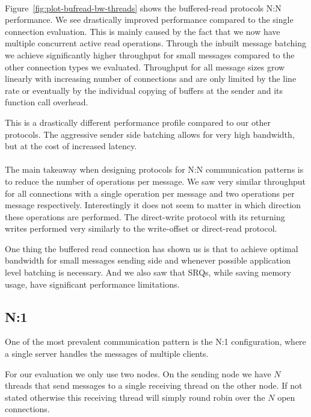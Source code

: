 \paragraph{} Figure~\ref{fig:plot-bufread-bw-threads} shows the buffered-read protocols N:N performance. We see drastically 
improved performance compared to the single connection evaluation. This is mainly caused by the fact that we now have multiple
concurrent active read operations. Through the inbuilt message batching we achieve  significantly higher throughput for small
messages compared to the other connection types we evaluated. Throughput for all message sizes grow linearly with increasing 
number of connections and are only limited by the line rate or eventually by the individual copying of buffers at the sender 
and its function call overhead.

This is a drastically different performance profile compared to our other protocols. 
The aggressive sender side batching allows
for very high bandwidth, but at the cost of increased latency.


\paragraph{} The main takeaway when designing protocols for N:N communication patterns is to reduce the number of operations
per message. We saw very similar throughput for all connections with a single operation per message and two operations per
message respectively. Interestingly it does not seem to matter in which direction these operations are performed. The 
direct-write protocol with its returning writes performed very similarly to the write-offset or direct-read protocol.

One thing the buffered read connection has shown us is that to achieve optimal bandwidth for small messages sending side and
whenever possible application level batching is necessary. And we also saw that SRQs, while saving memory usage, have 
significant performance limitations.



\pagebreak
\subsection{N:1}
One of the most prevalent communication pattern is the N:1 configuration, where a single server handles the messages
of multiple clients. 

For our evaluation we only use two nodes. On the sending node we have $N$ threads that send messages to a
single receiving thread on the other node. If not stated otherwise this receiving thread will simply 
round robin over the $N$ open connections. 

